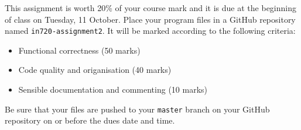\documentclass{article}
\begin{document}
This assignment is worth 20\% of your course mark and it is due at the beginning of class on Tuesday, 11 October. Place your program files in a GitHub repository named \texttt{in720-assignment2}. It will be marked according to the following criteria:

\begin{itemize}
  \item Functional correctness (50 marks)
  \item Code quality and origanisation (40 marks)
  \item Sensible documentation and commenting (10 marks)
  \end{itemize}
  
  Be sure that your files are pushed to your \texttt{master} branch on your GitHub repository on or before the dues date and time. 
 
\end{document}
